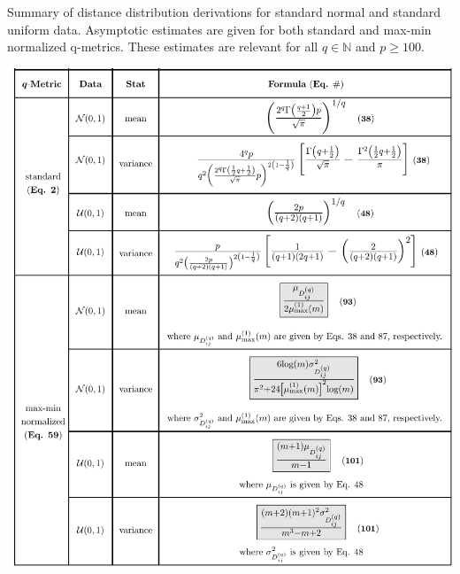 \documentclass[10pt,letterpaper]{article}\usepackage[]{graphicx}\usepackage[]{color}
\begin{document}

\begin{table}[H]
\caption{Summary of distance distribution derivations for standard normal and standard uniform data. Asymptotic estimates are given for both standard and max-min normalized q-metrics. These estimates are relevant for all $q \in \mathbb{N}$ and $p \geq 100$.}
\label{tab:dist_distr_general1}
\centering
\includegraphics[clip,trim=0.27cm 0.0cm 0.0cm 0.05cm,width=\textwidth]{updated_distributions_table(5-23-2019).pdf}
\end{table}
\end{document}

